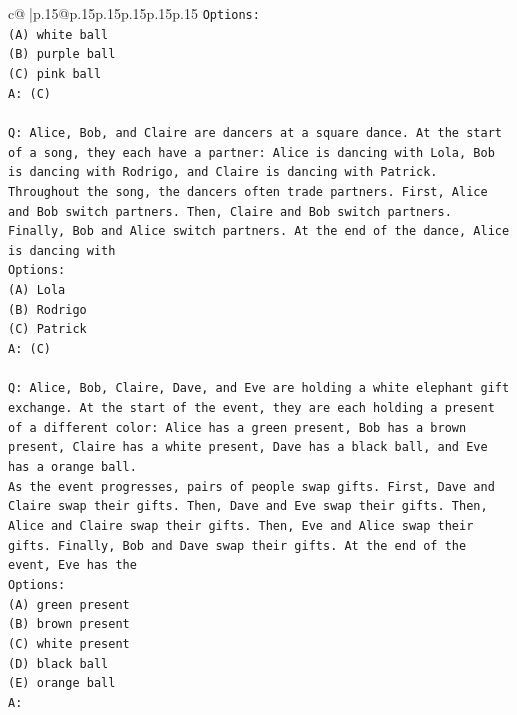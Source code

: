 \documentclass{article}
\begin{document}
{\begin{supertabular}{c@{$\;$}|p{.15\linewidth}@{}p{.15\linewidth}p{.15\linewidth}p{.15\linewidth}p{.15\linewidth}p{.15\linewidth}}
{{{\texttt{Options:} \\
\texttt{(A) white ball} \\
\texttt{(B) purple ball} \\
\texttt{(C) pink ball} \\
\texttt{A: (C)} \\
\\ 
\texttt{Q: Alice, Bob, and Claire are dancers at a square dance. At the start of a song, they each have a partner: Alice is dancing with Lola, Bob is dancing with Rodrigo, and Claire is dancing with Patrick.} \\
\texttt{Throughout the song, the dancers often trade partners. First, Alice and Bob switch partners. Then, Claire and Bob switch partners. Finally, Bob and Alice switch partners. At the end of the dance, Alice is dancing with} \\
\texttt{Options:} \\
\texttt{(A) Lola} \\
\texttt{(B) Rodrigo} \\
\texttt{(C) Patrick} \\
\texttt{A: (C)} \\
\\ 
\texttt{Q: Alice, Bob, Claire, Dave, and Eve are holding a white elephant gift exchange. At the start of the event, they are each holding a present of a different color: Alice has a green present, Bob has a brown present, Claire has a white present, Dave has a black ball, and Eve has a orange ball.} \\
\texttt{As the event progresses, pairs of people swap gifts. First, Dave and Claire swap their gifts. Then, Dave and Eve swap their gifts. Then, Alice and Claire swap their gifts. Then, Eve and Alice swap their gifts. Finally, Bob and Dave swap their gifts. At the end of the event, Eve has the} \\
\texttt{Options:} \\
\texttt{(A) green present} \\
\texttt{(B) brown present} \\
\texttt{(C) white present} \\
\texttt{(D) black ball} \\
\texttt{(E) orange ball} \\
\texttt{A:} \\
            }
        }
    }
     \\ \\


\end{supertabular}}
\end{document}
